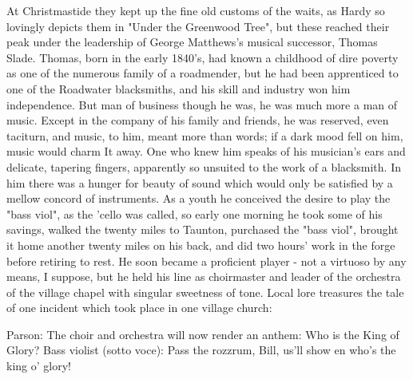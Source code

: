 At Christmastide they kept up the fine old customs of the waits, as Hardy so lovingly depicts them in "Under the Greenwood Tree", but these reached their peak under the leadership of George Matthews's musical successor, Thomas Slade. Thomas, born in the early 1840's, had known a childhood of dire poverty as one of the numerous family of a roadmender, but he had been apprenticed to one of the Roadwater blacksmiths, and his skill and industry won him independence. But man of business though he was, he was much more a man of music. Except in the company of his family and friends, he was reserved, even taciturn, and music, to him, meant more than words; if a dark mood fell on him, music would charm It away. One who knew him speaks of his musician's ears and delicate, tapering fingers, apparently so unsuited to the work of a blacksmith. In him there was a hunger for beauty of sound which would only be satisfied by a mellow concord of instruments. As a youth he conceived the desire to play the "bass viol", as the 'cello was called, so early one morning he took some of his savings, walked the twenty miles to Taunton, purchased the "bass viol", brought it home another twenty miles on his back, and did two hours' work in the forge before retiring to rest. He soon became a proficient player - not a virtuoso by any means, I suppose, but he held his line as choirmaster and leader of the orchestra of the village chapel with singular sweetness of tone. Local lore treasures the tale of one incident which took place in one village church:

Parson: The choir and orchestra will now render an anthem: Who is the King of Glory?
Bass violist (sotto voce): Pass the rozzrum, Bill, us'll show en who’s the king o’ glory!

